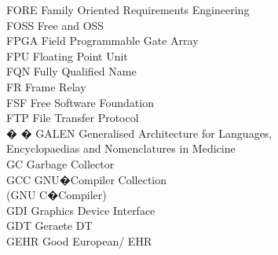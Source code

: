 \begin{tabbing}
    \>FORE \>\>Family Oriented Requirements Engineering\\

    \>FOSS \>\>Free and OSS\\

    \>FPGA \>\>Field Programmable Gate Array\\

    \>FPU \>\>Floating Point Unit\\

    \>FQN \>\>Fully Qualified Name\\

    \>FR \>\>Frame Relay\\


    \>FSF \>\>Free Software Foundation\\


    \>FTP \>\>File Transfer Protocol\\


� � \>GALEN \>\>Generalised Architecture for Languages,\\
        \>\>\>Encyclopaedias and Nomenclatures in Medicine\\


    \>GC \>\>Garbage Collector\\

    \>GCC \>\>GNU�Compiler Collection\\
        \>\>\>(GNU C�Compiler)\\

    \>GDI \>\>Graphics Device Interface\\

    \>GDT \>\>Geraete DT\\

    \>GEHR \>\>Good European/ EHR\\




\end{tabbing}
